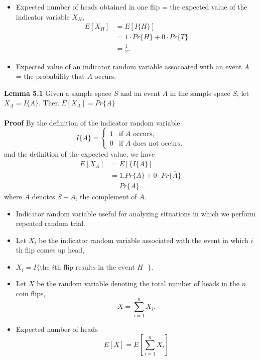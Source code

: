\documentclass{beamer}
\begin{document}
\begin{frame}{}

\begin{itemize}
\item Expected number of heads obtained in one flip = the expected value of the indicator variable $X_H$,
\begin{align*}
E[X_H] &= E[I\{H\}] \\
 &= 1\cdot Pr\{H\} + 0\cdot Pr\{T\} \\
 &= \frac{1}{2}.
\end{align*}
\item Expected value of an indicator random variable assocoated with an event $A$ = the probability that $A$ occurs. 
\end{itemize}
\end{frame}

\begin{frame}{}

{\bf Lemma 5.1} Given a sample space $S$ and an event $A$ in the sample space $S$, let $X_A=I\{A\}$. Then $E[X_A] = Pr\{A\}$\\
\ \\
{\bf Proof} By the definition of the indicator random variable 
\[
I\{A\} = \left \{ 
\begin{array}{ll} 
1 & \mbox {if $A$ occurs,} \\ 
0 & \mbox {if  $A$ does not occurs.}  
\end{array}
\right.
\]
and the definition of the expected value, we have 
\begin{align*}
E[X_A] &= E[\{I\{A\}] \\
 &= 1.Pr\{A\}+0\cdot Pr\{\overline{A}\} \\
 &= Pr\{A\}. 
\end{align*}
where $\overline{A}$ denotes $S-A$, the complement of $A$. 
\end{frame}

\begin{frame}{}
\begin{itemize}
\item Indicator random variable useful for analyzing situations in which we perform repeated random trial. 
\item Let $X_i$ be the indicator random variable associated with the event in which $i$th flip comes up head,
\item $X_i = I\{ \mbox{the $i$th flip results in the event $H$  } \}.$
\item Let $X$ be the random variable denoting the total number of heads in the $n$ coin flips, $$X=\sum_{i=1}^{n}X_i.$$ 
\item Expected number of heads $$E[X] = E\left [\sum_{i=1}^{n}X_i\right ]$$
\end{itemize}
\end{frame}
\end{document}
